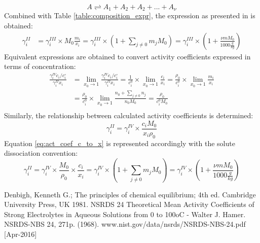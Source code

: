 \documentclass[onecolumn]{article}
\begin{document}
\[
A \rightleftharpoons A_1 + A_2 + A_2 + ... + A_{\nu}
\]
Combined with Table \ref{table:composition_expr}, the expression as presented in \cite{Hamer1968} is obtained:
\[
\begin{aligned}
\gamma_i^{II} & =  \gamma_i^{III} \times M_0 \frac{m_i}{x_i} = \gamma_i^{III} \times (1+\sum_{j\neq0}{m_j M_0}) = \gamma_i^{III} \times \left(1+\frac{\nu m M_0}{1000 \frac{g}{kg}} \right)
\end{aligned}
\]
Equivalent expressions are obtained to convert activity coefficients expressed in terms of concentration:
\[
\begin{aligned}
\frac{\gamma_i^{IV} c_i/c_i^{\circ}}{\gamma_i^{II} x_i} & = \lim_{x_0 \to 1} \frac{\gamma_i^{IV} c_i/c_i^{\circ}}{\gamma_i^{II} x_i} = \frac{1}{c_i^0} \times \lim_{x_0 \to 1} \frac{c_i}{x_i} = \frac{\rho_0}{c_i^0} \times \lim_{x_0 \to 1} \frac{m_i}{x_i} \\ & = \frac{\rho_0}{c_i^0} \times \lim_{x_0 \to 1}\frac{n_0+\sum_{j \neq 0}n_j}{n_0 M_0} = \frac{\rho_0}{c_i^0 M_0}\\
\end{aligned}
\]
Similarly, the relationship between calculated activity coefficients is determined:
\begin{equation}
\label{eq:act_coef_c_to_x}
\gamma_i^{II} = \gamma_i^{IV} \times \frac{c_i M_0}{x_i \rho_0}
\end{equation}
Equation \ref{eq:act_coef_c_to_x} is represented accordingly with the solute dissociation convention:
\[
\gamma_i^{II} = \gamma_i^{IV} \times \frac{M_0}{\rho_0}\times \frac{c_i}{x_i} = \gamma_i^{IV} \times (1 + \sum_{j\neq0}{m_jM_0}) = \gamma_i^{IV} \times \left(1+\frac{\nu m M_0}{1000 \frac{g}{kg}} \right)
\]
 \begin{thebibliography}{9}
  Denbigh, Kenneth G.; The principles of chemical equilibrium; 4th ed. Cambridge University Press, UK 1981.
  NSRDS 24 Theoretical Mean Activity Coefficients of Strong Electrolytes in Aqueous Solutions from 0 to 100oC - Walter J. Hamer. NSRDS-NBS 24, 271p. (1968). www.nist.gov/data/nsrds/NSRDS-NBS-24.pdf [Apr-2016]
 \end{thebibliography}
\end{document}

